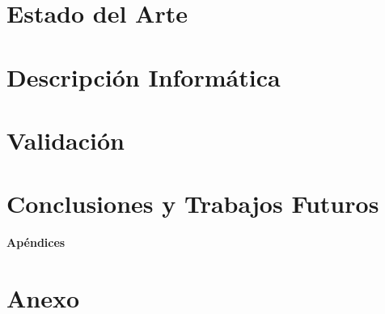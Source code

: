 \documentclass[12pt,twoside,titlepage]{report}
\newcommand\blankpage{%
    \newpage
    \null
    \thispagestyle{empty}%
    \newpage}
\begin{document}



\chapter{Estado del Arte}
\label{sec:estadodelarte}



\chapter{Descripción Informática}
\label{sec:descripcionInformatica}



\chapter{Validación}
\label{sec:validacion}




\chapter{Conclusiones y Trabajos Futuros}
\label{sec:conclusiones}



\blankpage



{}

\footnotesize{
%


}



\raggedbottom
\newpage


\appendix

{}

\mbox{}
\vfill
\begin{center}
\begin{Huge}
\textbf{Apéndices}
\end{Huge}
\end{center}
\vfill
\mbox{}
\thispagestyle{empty}

\mbox{}
\thispagestyle{empty}


\chapter{Anexo}
\label{sec:apendice}



\end{document}
